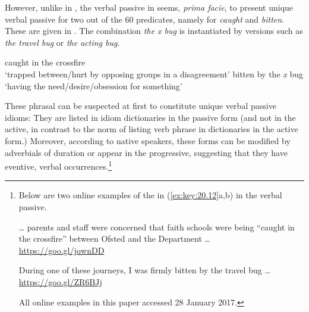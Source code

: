 \documentclass[output=paper]{langsci/langscibook}
\begin{document}
\ea\label{ex:key:20.9}
    \z
\z

\ea\label{ex:key:20.10}
    \z
\z

\ea\label{ex:key:20.11}
    \z
\z

However, unlike in , the verbal passive in  seems,
\emph{prima facie}, to present unique verbal passive 
for two out of the 60
predicates, namely for \emph{caught} and \emph{bitten}. These  are given
in . The combination \emph{the x bug} is instantiated by
versions such as \emph{the travel bug} or \emph{the acting bug}.

\ea\label{ex:key:20.12}
    \ea\label{ex:key:20.12a} caught in the crossfire\\
        ‘trapped between/hurt by opposing groups in a disagreement’
    \ex\label{ex:key:20.12b} bitten by the \emph{x} bug\\
        ‘having the need/desire/obsession for something’
    \z
\z

These phrasal  can be suspected at first to constitute unique verbal
passive idioms: They are listed in idiom dictionaries in the passive form (and
not in the active, in contrast to the norm of listing verb phrase  in
dictionaries in the active form.) Moreover, according to native speakers, these
forms can be modified by adverbials of duration or appear in the progressive,
suggesting that they have eventive, verbal occurrences.\footnote{Below
are two online examples of the  in (\ref{ex:key:20.12}a,b) in the
verbal passive.

\begin{exe}

     \dots{} parents and staff were concerned that faith schools were
    being “caught in the crossfire” between Ofsted and the Department
    \dots{}\\\hspace*{\fill}\url{https://goo.gl/jqwnDD}

     During one of these journeys, I was firmly bitten by the travel
    bug \dots{}\\\hspace*{\fill}\url{https://goo.gl/ZR6BJj}

\end{exe}

All online examples in this paper accessed 28 January 2017.}
\end{document}
